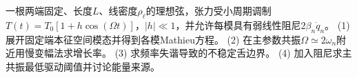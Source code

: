 一根两端固定、长度\(L\)、线密度\(\rho_\ell\)的理想弦，张力受小周期调制\(T(t)=T_0[1+h\cos(\Omega t)]\)，\(|h|\ll1\)，并允许每模具有弱线性阻尼\(2\beta_n\dot q_n\)。
(1) 展开固定端本征空间模态并得到各模Mathieu方程。
(2) 在主参数共振\(\Omega\simeq2\omega_n\)附近用慢变幅法求增长率。
(3) 求频率失谐导致的不稳定舌边界。
(4) 加入阻尼求主共振最低驱动阈值并讨论能量来源。
